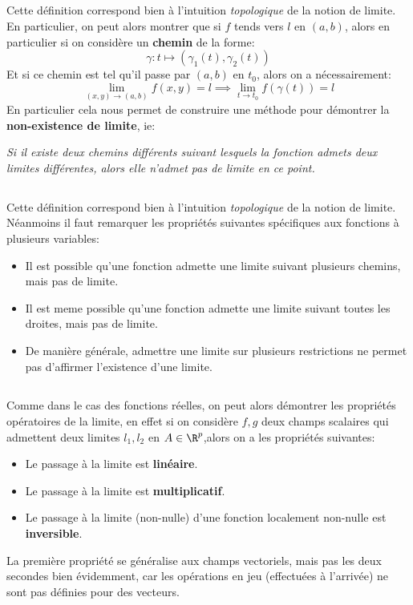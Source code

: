 \subsection*{}
Cette définition correspond bien à l'intuition \textit{topologique} de la notion de limite. En particulier, on peut alors montrer que si \(f\) tends vers \(l\) en \((a, b)\), alors en particulier si on considère un \textbf{chemin} de la forme:
\[
   \gamma : t \mapsto (\gamma_1(t), \gamma_2(t))   
\]
Et si ce chemin est tel qu'il passe par \((a, b)\) en \(t_0\), alors on a nécessairement:
\[
   \lim_{(x, y) \rightarrow (a, b)} f(x, y) = l \implies \lim_{t \rightarrow t_0} f(\gamma(t)) = l
\]
En particulier cela nous permet de construire une méthode pour démontrer la \textbf{non-existence de limite}, ie:
\begin{center}
   \textit{Si il existe deux chemins différents suivant lesquels la fonction admets deux limites différentes, alors elle n'admet pas de limite en ce point.}
\end{center}
\subsection*{}
Cette définition correspond bien à l'intuition \textit{topologique} de la notion de limite. Néanmoins il faut remarquer les propriétés suivantes spécifiques aux fonctions à plusieurs variables:
\begin{itemize}
   \item Il est possible qu'une fonction admette une limite suivant plusieurs chemins, mais pas de limite.
   \item Il est meme possible qu'une fonction admette une limite suivant toutes les droites, mais pas de limite.
   \item De manière générale, admettre une limite sur plusieurs restrictions ne permet pas d'affirmer l'existence d'une limite.
\end{itemize}

\subsection*{}
Comme dans le cas des fonctions réelles, on peut alors démontrer les propriétés opératoires de la limite, en effet si on considère \(f, g\) deux champs scalaires qui admettent deux limites \(l_1, l_2\) en \(A \in \R^p\),alors on a les propriétés suivantes:
\begin{itemize}
   \item Le passage à la limite est \textbf{linéaire}.
   \item Le passage à la limite est \textbf{multiplicatif}.
   \item Le passage à la limite (non-nulle) d'une fonction localement non-nulle est \textbf{inversible}.
\end{itemize}
La première propriété se généralise aux champs vectoriels, mais pas les deux secondes bien évidemment, car les opérations en jeu (effectuées à l'arrivée) ne sont pas définies pour des vecteurs.\<

